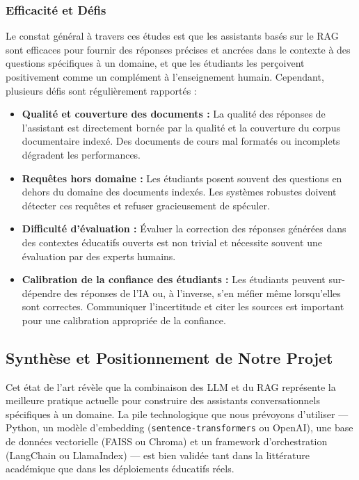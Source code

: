\documentclass[a4paper,11pt]{article}
\begin{document}
\subsubsection{Efficacité et Défis}

Le constat général à travers ces études est que les assistants basés sur le
RAG sont efficaces pour fournir des réponses précises et ancrées dans le
contexte à des questions spécifiques à un domaine, et que les étudiants les
perçoivent positivement comme un complément à l'enseignement humain.
Cependant, plusieurs défis sont régulièrement rapportés :

\begin{itemize}
  \item \textbf{Qualité et couverture des documents :} La qualité des réponses
    de l'assistant est directement bornée par la qualité et la couverture du
    corpus documentaire indexé. Des documents de cours mal formatés ou
    incomplets dégradent les performances.
  \item \textbf{Requêtes hors domaine :} Les étudiants posent souvent des
    questions en dehors du domaine des documents indexés. Les systèmes robustes
    doivent détecter ces requêtes et refuser gracieusement de spéculer.
  \item \textbf{Difficulté d'évaluation :} Évaluer la correction des réponses
    générées dans des contextes éducatifs ouverts est non trivial et nécessite
    souvent une évaluation par des experts humains.
  \item \textbf{Calibration de la confiance des étudiants :} Les étudiants
    peuvent sur-dépendre des réponses de l'IA ou, à l'inverse, s'en méfier
    même lorsqu'elles sont correctes. Communiquer l'incertitude et citer les
    sources est important pour une calibration appropriée de la confiance.
\end{itemize}

\newpage
\subsection{Synthèse et Positionnement de Notre Projet}

Cet état de l'art révèle que la combinaison des LLM et du RAG représente la
meilleure pratique actuelle pour construire des assistants conversationnels
spécifiques à un domaine. La pile technologique que nous prévoyons d'utiliser
--- Python, un modèle d'embedding (\texttt{sentence-transformers} ou OpenAI),
une base de données vectorielle (FAISS ou Chroma) et un framework
d'orchestration (LangChain ou LlamaIndex) --- est bien validée tant dans la
littérature académique que dans les déploiements éducatifs réels.
\end{document}
